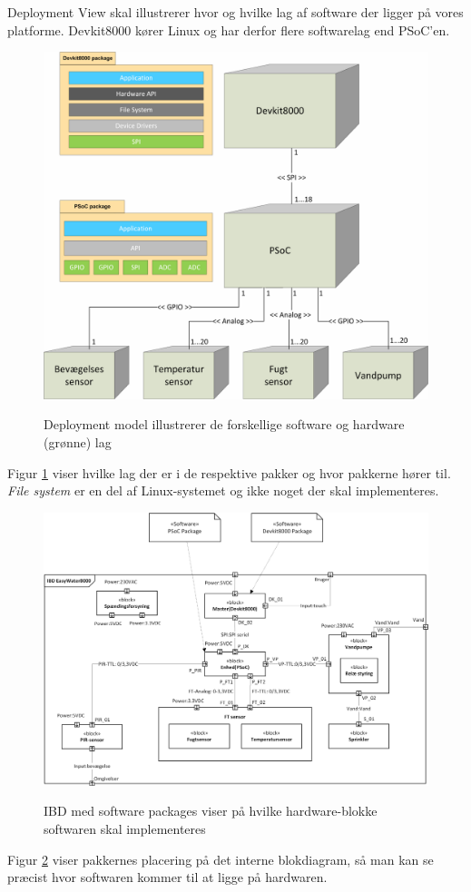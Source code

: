 
Deployment View skal illustrerer hvor og hvilke lag af software der ligger på vores platforme. Devkit8000 kører Linux og har derfor flere softwarelag end PSoC'en.
 
\vspace{15 mm}

\begin{figure}[htbp] \centering
{\includegraphics[scale=0.7]{filer/systemarkitektur/Deployment_model}}
\caption{Deployment model illustrerer de forskellige software og hardware (grønne) lag}
\label{fig:Deployment Model}
\end{figure}

Figur \ref{fig:Deployment Model} viser hvilke lag der er i de respektive pakker og hvor pakkerne hører til. \textit{File system} er en del af Linux-systemet og ikke noget der skal implementeres.

\clearpage

\begin{figure}[!htbp] \centering
{\includegraphics[scale=0.7]{filer/systemarkitektur/IBD_deployment}}
\caption{IBD med software packages viser på hvilke hardware-blokke softwaren skal implementeres}
\label{fig:IBD deployment}
\end{figure}

Figur \ref{fig:IBD deployment} viser pakkernes placering på det interne blokdiagram, så man kan se præcist hvor softwaren kommer til at ligge på hardwaren.